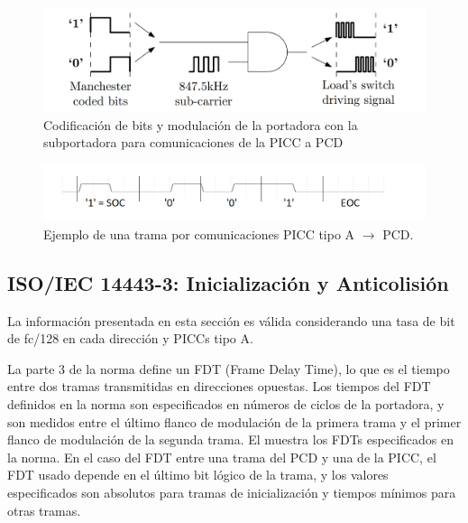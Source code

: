 \documentclass[a4paper, twoside, 11pt]{report}
\begin{document}
\begin{figure}[htb]
  \centering
  \includegraphics[scale=0.35]{./img/picc_to_pcd}
  \caption{Codificación de bits y modulación de la portadora con la subportadora para comunicaciones de la PICC a PCD~\cite{fabricio_eamta}}
  \label{fig:picc_to_pcd}
\end{figure}

\begin{figure}[htb]
  \centering
  \includegraphics[scale=0.5]{./img/tx_frame_example}
  \caption{Ejemplo de una trama por comunicaciones PICC tipo A $\rightarrow$ PCD.}
  \label{fig:tx_frame_example}
\end{figure}

\FloatBarrier
\subsection{ISO/IEC 14443-3: \large{Inicialización y Anticolisión}}
\label{sec:introduction_iso14443-3}

La información presentada en esta sección es válida considerando una tasa de bit de fc/128 en cada dirección y PICCs tipo A.

La parte 3 de la norma define un FDT (Frame Delay Time), lo que es el tiempo entre dos tramas transmitidas en direcciones opuestas. Los tiempos del FDT definidos en la norma son especificados en números de ciclos de la portadora, y son medidos entre el último flanco de modulación de la primera trama y el primer flanco de modulación de la segunda trama. El  muestra los FDTs especificados en la norma. En el caso del FDT entre una trama del PCD y una de la PICC, el FDT usado depende en el último bit lógico de la trama, y los valores especificados son absolutos para tramas de inicialización y tiempos mínimos para otras tramas.
\end{document}
